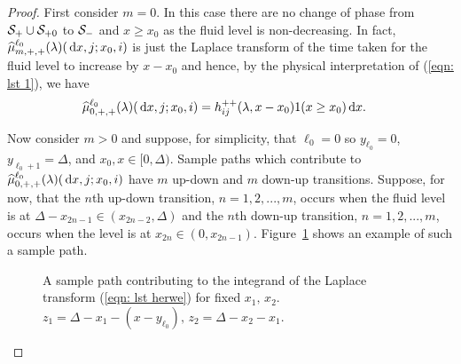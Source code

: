 \begin{proof}
First consider \(m=0\). In this case there are no change of phase from \(\mathcal{S}_+\cup\mathcal{S}_{+0}\) to \(\mathcal{S}_-\) and \(x\geq x_0\) as the fluid level is non-decreasing. In fact, \(\widehat \mu^{\ell_0}_{m,+,+}(\lambda)( \, \mathrm{d} x, j; x_0,i)\) is just the Laplace transform of the time taken for the fluid level to increase by \(x-x_0\) and hence, by the physical interpretation of (\ref{eqn: lst 1}), we have
\begin{align*}
	\widehat \mu^{\ell_0}_{0,+,+}(\lambda)( \, \mathrm{d} x,j;x_0,i) &= h_{ij}^{++}(\lambda,x-x_0)1(x\geq x_0)\, \mathrm{d} x.
\end{align*}

Now consider \(m>0\) and suppose, for simplicity, that \(\ell_0=0\) so \(y_{\ell_0}=0\), \(y_{\ell_0+1}=\Delta\), and \(x_0,x\in[0,\Delta)\). Sample paths which contribute to \(\widehat \mu^{\ell_0}_{0,+,+}(\lambda)( \, \mathrm{d} x,j;x_0,i)\) have \(m\) up-down and \(m\) down-up transitions. Suppose, for now, that the \(n\)th up-down transition, \(n=1,2,...,m\), occurs when the fluid level is at \(\Delta-x_{2n-1}\in(x_{2n-2},\Delta)\) and the \(n\)th down-up transition, \(n=1,2,...,m\), occurs when the level is at \(x_{2n}\in(0,x_{2n-1})\). Figure~\ref{fig: sample paths lst} shows an example of such a sample path. 

\begin{figure}
    \centering{}
    \caption{\label{fig: sample paths lst} A sample path contributing to the integrand of the Laplace transform (\ref{eqn: lst herwe}) for fixed \(x_1,\, x_2\). \(z_1 = \Delta - x_1-(x-y_{\ell_0}),\, z_2= \Delta - x_2-x_1\).}
\end{figure}


\end{proof}
